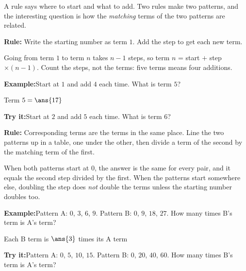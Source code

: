 \documentclass[12pt]{article}
\begin{document}

\noindent\small A rule says where to start and what to add. Two rules make two
patterns, and the interesting question is how the \emph{matching} terms of the
two patterns are related.\normalsize

\begin{formulabox}
\textbf{Rule:} Write the starting number as term $1$. Add the step to get each
new term.\par
Going from term $1$ to term $n$ takes $n - 1$ steps, so
term $n$ = start $+$ step $\times (n-1)$. Count the steps, not the terms: five
terms means four additions.
\end{formulabox}
\begin{examplebox}
\textbf{Example:}\quad Start at $1$ and add $4$ each time. What is term $5$?

Term $5 = \ans{17}$
\end{examplebox}
\begin{tryitbox}
\textbf{Try it:}\quad Start at $2$ and add $5$ each time. What is term $6$?\\[2pt]
\end{tryitbox}

\begin{formulabox}
\textbf{Rule:} Corresponding terms are the terms in the same place. Line the
two patterns up in a table, one under the other, then divide a term of the
second by the matching term of the first.\par
When both patterns start at $0$, the answer is the same for every pair, and it
equals the second step divided by the first. When the patterns start somewhere
else, doubling the step does \emph{not} double the terms unless the starting
number doubles too.
\end{formulabox}
\begin{examplebox}
\textbf{Example:}\quad Pattern A: $0$, $3$, $6$, $9$. Pattern B: $0$, $9$,
$18$, $27$. How many times B's term is A's term?

Each B term is $\ans{3}$ times its A term
\end{examplebox}
\begin{tryitbox}
\textbf{Try it:}\quad Pattern A: $0$, $5$, $10$, $15$. Pattern B: $0$, $20$,
$40$, $60$. How many times B's term is A's term?\\[2pt]
\end{tryitbox}
\end{document}
